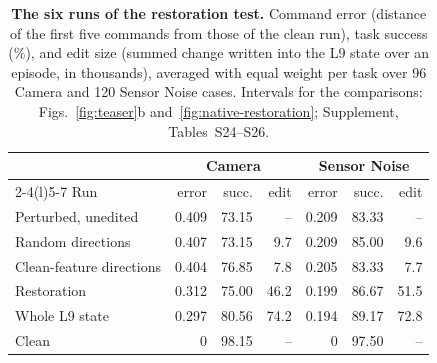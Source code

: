 \begin{table}[t]
\centering\small
\setlength{\tabcolsep}{2.6pt}
\begin{tabular}{@{}lrrrrrr@{}}
\toprule
 & \multicolumn{3}{c}{Camera} & \multicolumn{3}{c}{Sensor Noise}\\
\cmidrule(lr){2-4}\cmidrule(l){5-7}
Run & error & succ. & edit & error & succ. & edit\\
\midrule
Perturbed, unedited & 0.409 & 73.15 & -- & 0.209 & 83.33 & --\\
Random directions & 0.407 & 73.15 & 9.7 & 0.209 & 85.00 & 9.6\\
Clean-feature directions & 0.404 & 76.85 & 7.8 & 0.205 & 83.33 & 7.7\\
Restoration & 0.312 & 75.00 & 46.2 & 0.199 & 86.67 & 51.5\\
Whole L9 state & 0.297 & 80.56 & 74.2 & 0.194 & 89.17 & 72.8\\
Clean & 0 & 98.15 & -- & 0 & 97.50 & --\\
\bottomrule
\end{tabular}
\caption{\textbf{The six runs of the restoration test.} Command error (distance of the first five commands from those of the clean run), task success (\%), and edit size (summed change written into the L9 state over an episode, in thousands), averaged with equal weight per task over 96 Camera and 120 Sensor Noise cases. Intervals for the comparisons: Figs.~\ref{fig:teaser}b and~\ref{fig:native-restoration}; Supplement, Tables~S24--S26.}
\label{tab:restoration}
\end{table}
